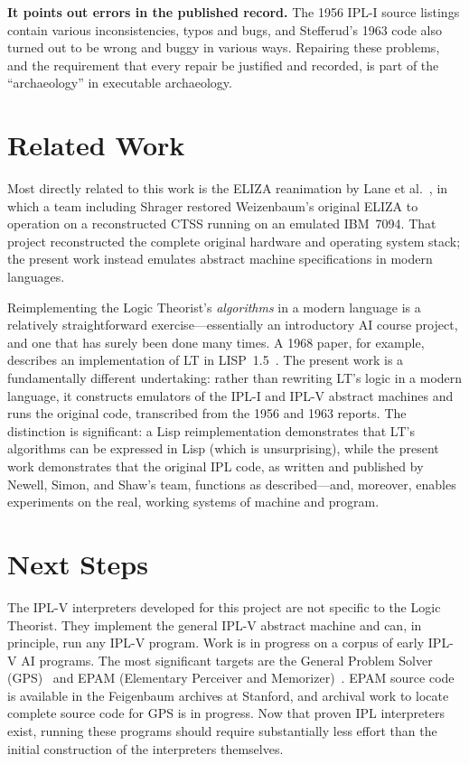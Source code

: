 \documentclass[journal]{IEEEtran}
\begin{document}
\textbf{It points out errors in the published record.}  The 1956 
IPL-I source listings contain various inconsistencies, typos and
bugs, and Stefferud's 1963 code also turned out to be wrong and
buggy in various ways.  Repairing these problems, and the requirement
that every repair be justified and recorded, is part of the ``archaeology''
in executable archaeology.

\section{Related Work}
\label{sec:related}

Most directly related to this work
is the ELIZA reanimation by Lane
et al.~\cite{lane2025eliza}, in which a team including Shrager
restored Weizenbaum's original ELIZA to operation on a
reconstructed CTSS running on an emulated IBM~7094. That project
reconstructed the complete original hardware and operating system
stack; the present work instead emulates abstract machine
specifications in modern languages.

Reimplementing the Logic Theorist's \textit{algorithms} in a modern
language is a relatively straightforward exercise---essentially an
introductory AI course project, and one that has surely been done many
times. A 1968 paper, for example, describes an implementation of LT in
LISP~1.5~\cite{millstein1968logic}. The present work is a
fundamentally different undertaking: rather than rewriting LT's logic
in a modern language, it constructs emulators of the IPL-I
and IPL-V abstract machines and runs the original code, transcribed
from the 1956 and 1963 reports. The distinction is
significant: a Lisp reimplementation demonstrates that LT's algorithms
can be expressed in Lisp (which is unsurprising), while the present
work demonstrates that the original IPL code, as written and published
by Newell, Simon, and Shaw's team, functions as described---and,
moreover, enables experiments on the real, working systems of machine
and program.

\section{Next Steps}
\label{sec:next}

The IPL-V interpreters developed for this project are not specific to
the Logic Theorist. They implement the general IPL-V abstract machine
and can, in principle, run any IPL-V program. Work is in progress on
a corpus of early IPL-V AI programs. The most significant targets are
the General Problem Solver (GPS)~\cite{newell1959gps} and EPAM
(Elementary Perceiver and Memorizer)~\cite{feigenbaum1961epam}. 
EPAM source code is available in the Feigenbaum archives at Stanford, and
archival work to locate complete source code for GPS is in progress.
Now that proven IPL interpreters exist, running these programs should
require substantially less effort than the initial construction of
the interpreters themselves.
\end{document}
